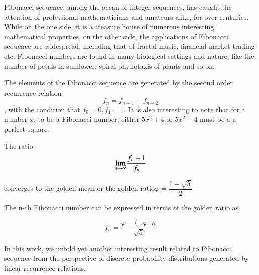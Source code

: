 \begin{multicols}{2}

Fibonacci sequence, among the ocean of integer sequences, has caught the attention of professional mathematicians and amateurs alike, for over centuries. While on the one side, it is a treasure house of numerous interesting mathematical properties, on the other side, the applications of Fibonacci sequence are widespread, including that of fractal music, financial market trading etc. Fibonacci numbers are found in many biological settings and nature, like the number of petals in sunflower, spiral phyllotaxis of plants and so on.

The elements of the Fibonacci sequence are generated by the second order recurrence relation
$$
f_{n}=f_{n-1}+f_{n-2}
$$
, with the condition that $f_{0} = 0, f_{1} = 1$. It is also interesting to note that for a number $x$. to be a Fibonacci number, either $5x^{2} + 4$ or $5x^{2}-4$ must be a a perfect square.

The ratio
$$
{\rm \lim_{{\it n} \rightarrow \infty}} \dfrac{f_{n}+1}{f_{n}}
$$

converges to the golden mean or the golden ratio\break $\varphi =\dfrac{1+\sqrt{5}}{2}$

The n-th Fibonacci number can be expressed in terms of the golden ratio as

$$
f_{n}= \dfrac{\varphi-(-\varphi^{-}n}{\sqrt{5}}
$$

In this work, we unfold yet another interesting result related to Fibonacci sequence from the perspective of discrete probability distributions generated by linear recurrence relations.


\end{multicols}


